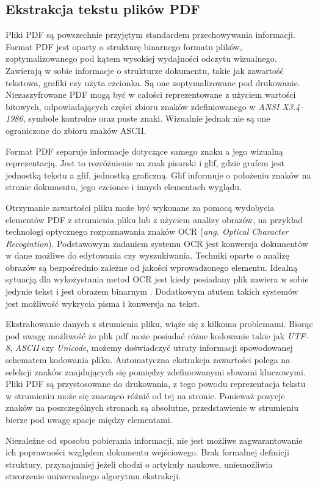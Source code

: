 \documentclass[12pt,a4paper,twoside]{article}
\begin{document}
\subsection{Ekstrakcja tekstu plików PDF}
Pliki PDF są powszechnie przyjętym standardem przechowywania informacji. Format PDF jest oparty o strukturę binarnego formatu plików, zoptymalizowanego pod kątem wysokiej wydajności odczytu wizualnego. Zawierają w sobie informacje o strukturze dokumentu, takie jak zawartość tekstowa, grafiki czy użyta czcionka. Są one zoptymalizowane pod drukowanie. Niezaszyfrowane PDF mogą być w całości reprezentowane z użyciem wartości bitowych, odpowiadających części zbioru znaków zdefiniowanego w \textit{ANSI X3.4-1986}, symbole kontrolne oraz puste znaki. Wizualnie jednak nie są one ograniczone do zbioru znaków ASCII.\par
Format PDF separuje informacje dotyczące samego znaku a jego wizualną reprezentacją. Jest to rozróżnienie na znak pisarski i glif, gdzie grafem jest jednostką tekstu a glif, jednostką graficzną. Glif informuje o położeniu znaków na stronie dokumentu, jego czcionce i innych elementach wyglądu. \par
Otrzymanie zawartości pliku może być wykonane za pomocą wydobycia elementów PDF z strumienia pliku lub z użyciem analizy obrazów, na przykład technologi optycznego rozpoznawania znaków OCR (\textit{ang. Optical Character Recogintion}). 
Podstawowym zadaniem systemu OCR jest konwersja dokumentów w dane możliwe do edytowania czy wyszukiwania. Techniki oparte o analizę obrazów są bezpośrednio zależne od jakości wprowadzonego elementu. Idealną sytuacją dla wykożystania metod OCR jest kiedy posiadany plik zawiera w sobie jedynie tekst i jest obrazem binarnym \cite{mithe2013optical}. Dodatkowym atutem takich systemów jest możliwość wykrycia pisma i konwersja na tekst.\par
Ekstrahowanie danych z strumienia pliku, wiąże się z kilkoma problemami. Biorąc pod uwagę możliwość że plik pdf może posiadać różne kodowanie takie jak \textit{UTF-8}, \textit{ASCII} czy \textit{Unicode}, możemy doświadczyć utraty informacji spowodowanej schematem kodowania pliku. Automatyczna ekstrakcja zawartości polega na selekcji znaków znajdujących się pomiędzy zdefiniowanymi słowami kluczowymi. Pliki PDF są przystosowane do drukowania, z tego powodu reprezentacja tekstu w strumieniu może się znacząco różnić od tej na stronie. Ponieważ pozycje znaków na poszczególnych stronach są absolutne, przedstawienie w strumieniu bierze pod uwagę spacje między elementami.\par
Niezależne od sposobu pobierania informacji, nie jest możliwe zagwarantowanie ich poprawności względem dokumentu wejściowego. Brak formalnej definicji struktury, przynajmniej jeżeli chodzi o artykuły naukowe, uniemożliwia stworzenie uniwersalnego algorytmu ekstrakcji.
\newpage
\end{document}
